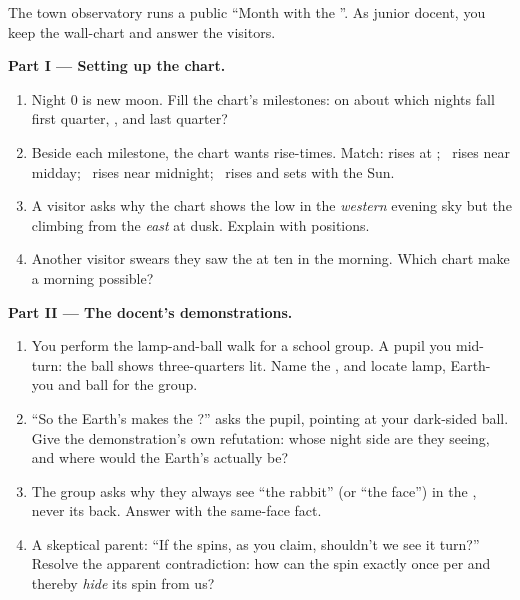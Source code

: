 \begin{problem}\label{pb:g7:moon-phases:1}
The town observatory runs a public ``Month with the ''. As
junior docent, you keep the wall-chart and answer the visitors.

\medskip\noindent\textbf{Part I --- Setting up the chart.}
\begin{enumerate}
  \item Night 0 is new moon. Fill the chart's milestones: on
        about which nights fall first quarter, , and
        last quarter?
  \item Beside each milestone, the chart wants rise-times.
        Match: rises at ; \ rises near midday; \ rises
        near midnight; \ rises and sets with the Sun.
  \item A visitor asks why the chart shows the  low in
        the \emph{western} evening sky but the 
        climbing from the \emph{east} at dusk. Explain with
         positions.
  \item Another visitor swears they saw the  at ten in the
        morning. Which chart  make a morning 
        possible?
\end{enumerate}

\medskip\noindent\textbf{Part II --- The docent's
demonstrations.}
\begin{enumerate}[resume]
  \item You perform the lamp-and-ball walk for a school group.
        A pupil  you mid-turn: the ball shows
        three-quarters lit. Name the , and locate lamp,
        Earth-you and ball for the group.
  \item ``So the Earth's  makes the ?'' asks the
        pupil, pointing at your dark-sided ball. Give the
        demonstration's own refutation: whose night side are
        they seeing, and where would the Earth's 
        actually be?
  \item The group asks why they always see ``the rabbit'' (or
        ``the face'') in the , never its back. Answer with
        the same-face fact.
  \item A skeptical parent: ``If the  spins, as you claim,
        shouldn't we see it turn?'' Resolve the apparent
        contradiction: how can the  spin exactly once per
         and thereby \emph{hide} its spin from us?
\end{enumerate}


\end{problem}

